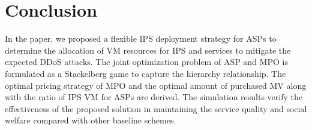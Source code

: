 \documentclass[conference]{IEEEtran}
\begin{document}
\section{Conclusion} \label{sec:conclusion}
In the paper, we proposed a flexible IPS deployment strategy for ASPs to determine the allocation of VM resources for IPS and services to mitigate the expected DDoS attacks. The joint optimization problem of ASP and MPO is formulated as a Stackelberg game to capture the hierarchy relationship. The optimal pricing strategy of MPO and the optimal amount of purchased MV along with the ratio of IPS VM for ASPs are derived. The simulation results verify the effectiveness of the proposed solution in maintaining the service quality and social welfare compared with other baseline schemes.




\end{document}
